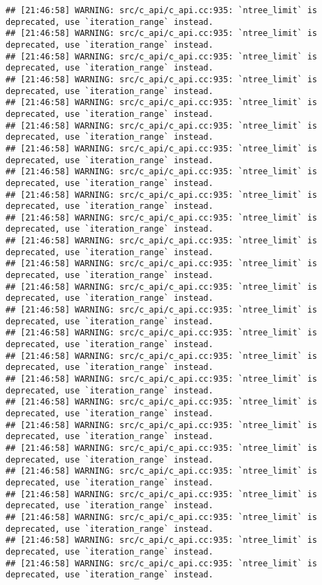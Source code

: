 \documentclass[
]{article}
\begin{document}
\begin{verbatim}
## [21:46:58] WARNING: src/c_api/c_api.cc:935: `ntree_limit` is deprecated, use `iteration_range` instead.
## [21:46:58] WARNING: src/c_api/c_api.cc:935: `ntree_limit` is deprecated, use `iteration_range` instead.
## [21:46:58] WARNING: src/c_api/c_api.cc:935: `ntree_limit` is deprecated, use `iteration_range` instead.
## [21:46:58] WARNING: src/c_api/c_api.cc:935: `ntree_limit` is deprecated, use `iteration_range` instead.
## [21:46:58] WARNING: src/c_api/c_api.cc:935: `ntree_limit` is deprecated, use `iteration_range` instead.
## [21:46:58] WARNING: src/c_api/c_api.cc:935: `ntree_limit` is deprecated, use `iteration_range` instead.
## [21:46:58] WARNING: src/c_api/c_api.cc:935: `ntree_limit` is deprecated, use `iteration_range` instead.
## [21:46:58] WARNING: src/c_api/c_api.cc:935: `ntree_limit` is deprecated, use `iteration_range` instead.
## [21:46:58] WARNING: src/c_api/c_api.cc:935: `ntree_limit` is deprecated, use `iteration_range` instead.
## [21:46:58] WARNING: src/c_api/c_api.cc:935: `ntree_limit` is deprecated, use `iteration_range` instead.
## [21:46:58] WARNING: src/c_api/c_api.cc:935: `ntree_limit` is deprecated, use `iteration_range` instead.
## [21:46:58] WARNING: src/c_api/c_api.cc:935: `ntree_limit` is deprecated, use `iteration_range` instead.
## [21:46:58] WARNING: src/c_api/c_api.cc:935: `ntree_limit` is deprecated, use `iteration_range` instead.
## [21:46:58] WARNING: src/c_api/c_api.cc:935: `ntree_limit` is deprecated, use `iteration_range` instead.
## [21:46:58] WARNING: src/c_api/c_api.cc:935: `ntree_limit` is deprecated, use `iteration_range` instead.
## [21:46:58] WARNING: src/c_api/c_api.cc:935: `ntree_limit` is deprecated, use `iteration_range` instead.
## [21:46:58] WARNING: src/c_api/c_api.cc:935: `ntree_limit` is deprecated, use `iteration_range` instead.
## [21:46:58] WARNING: src/c_api/c_api.cc:935: `ntree_limit` is deprecated, use `iteration_range` instead.
## [21:46:58] WARNING: src/c_api/c_api.cc:935: `ntree_limit` is deprecated, use `iteration_range` instead.
## [21:46:58] WARNING: src/c_api/c_api.cc:935: `ntree_limit` is deprecated, use `iteration_range` instead.
## [21:46:58] WARNING: src/c_api/c_api.cc:935: `ntree_limit` is deprecated, use `iteration_range` instead.
## [21:46:58] WARNING: src/c_api/c_api.cc:935: `ntree_limit` is deprecated, use `iteration_range` instead.
## [21:46:58] WARNING: src/c_api/c_api.cc:935: `ntree_limit` is deprecated, use `iteration_range` instead.
## [21:46:58] WARNING: src/c_api/c_api.cc:935: `ntree_limit` is deprecated, use `iteration_range` instead.
## [21:46:58] WARNING: src/c_api/c_api.cc:935: `ntree_limit` is deprecated, use `iteration_range` instead.

\end{verbatim}
\end{document}
